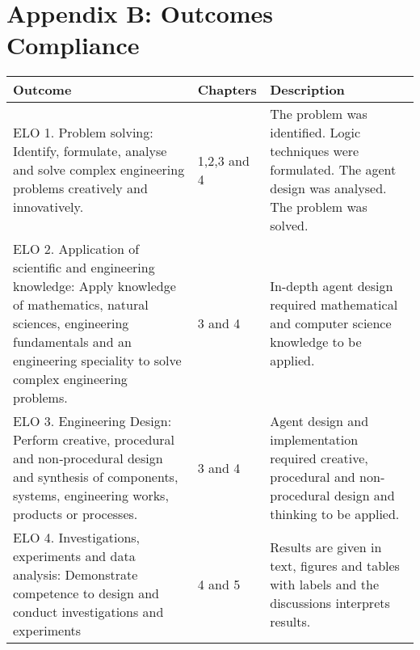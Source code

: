 \setcounter{table}{0}
\renewcommand{\thetable}{B.\arabic{table}}

\vspace{-5cm}



\chapter{Appendix B: Outcomes Compliance}

\vspace{-1cm}

    
 \begin{table}[H]
  \begin{center}
    \begin{tabular}{ | p{8cm} | l | p{6cm} |}
    \hline
    
    Outcome & Chapters & Description \\ \hline \hline
    
    ELO 1. Problem solving: Identify, formulate, analyse and solve complex	engineering problems creatively and innovatively. & 1,2,3 and 4 & The problem was identified. Logic techniques were formulated. The agent design was analysed. The problem was solved. \\ \hline
    
    
    ELO 2. Application of scientific and engineering knowledge: Apply knowledge of mathematics, natural sciences,
engineering fundamentals and an engineering speciality to solve complex engineering problems. & 3 and 4 & In-depth agent design required mathematical and computer science knowledge to be applied. \\ \hline
    
    
    ELO 3. Engineering Design: Perform creative, procedural and non‐procedural design and synthesis of components, systems, engineering works, products or processes. & 3 and 4 & Agent design and implementation required creative, procedural and non‐procedural design and thinking to be applied. \\ \hline



    ELO 4. Investigations, experiments and data analysis: Demonstrate competence to design and conduct investigations and experiments & 4 and 5 & Results are given in text, figures and tables with labels and the discussions interprets results.  \\  \hline



\end{tabular}
\end{center}
\end{table}
